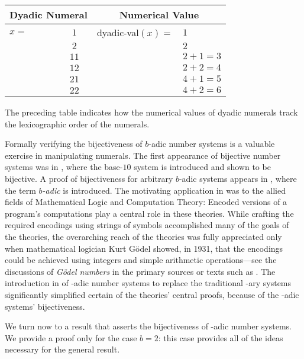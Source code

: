 \smallskip

\begin{tabular}{|lc|ll|}
\hline
\multicolumn{2}{c}{\bf Dyadic Numeral} & \multicolumn{2}{c}{\bf Numerical Value} \\
\hline
$x=$ & $1$  & {\sc dyadic-val}$(x) =$ & $1$ \\
     & $2$  &                         & $2$ \\
     & $11$ &                         & $2 + 1 = 3$ \\
     & $12$ &                         & $2 + 2 = 4$ \\
     & $21$ &                         & $4 + 1 = 5$ \\
     & $22$ &                         & $4 + 2 = 6$ \\
\hline
\end{tabular}

\medskip
\noindent
The preceding table indicates how the numerical values of dyadic
numerals track the lexicographic order of the numerals.

\bigskip

Formally verifying the bijectiveness of $b$-adic number systems is a
valuable exercise in manipulating numerals.  The first appearance of
bijective number systems was in \cite{Foster47}, where the base-$10$
system is introduced and shown to be bijective.  A proof of
bijectiveness for arbitrary $b$-adic systems appears in
\cite{Smullyan61}, where the term {\em $b$-adic} is introduced.  The
motivating application in \cite{Smullyan61} was to the allied fields
of Mathematical Logic and Computation Theory: Encoded versions of a
program's computations play a central role in these theories.  While
crafting the required encodings using strings of symbols accomplished
many of the goals of the theories, the overarching reach of the
theories was fully appreciated only when mathematical logician Kurt
G\"{o}del  showed, in 1931, that the encodings
could be achieved using integers and simple arithmetic
operations---see the discussions of {\it G\"{o}del numbers}
 in the primary sources
\cite{Goedel31,Turing36} or texts such as \cite{Rosenberg12}.  The
introduction in \cite{Smullyan61} of -adic number systems to replace
the traditional -ary systems significantly simplified certain of the
theories' central proofs, because of the -adic systems' bijectiveness.

We turn now to a result that asserts the bijectiveness of -adic number
systems.  We provide a proof only for the case $b = 2$: this case
provides all of the ideas necessary for the general result.

